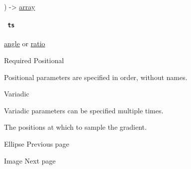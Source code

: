 ) -\textgreater{} \href{/docs/reference/foundations/array/}{array}

\paragraph{\texorpdfstring{\texttt{\ ts\ }}{ ts }}\label{definitions-samples-ts}

\href{/docs/reference/layout/angle/}{angle} {or}
\href{/docs/reference/layout/ratio/}{ratio}

{Required} {{ Positional }}

\label{definitions-samples-ts-positional-tooltip}
Positional parameters are specified in order, without names.

{{ Variadic }}

\label{definitions-samples-ts-variadic-tooltip}
Variadic parameters can be specified multiple times.

The positions at which to sample the gradient.

\href{/docs/reference/visualize/ellipse/}{\pandocbounded{}}

{ Ellipse } { Previous page }

\href{/docs/reference/visualize/image/}{\pandocbounded{}}

{ Image } { Next page }
